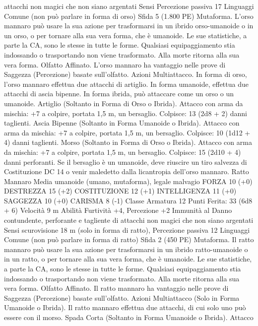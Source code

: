 \begin{multicols}{2}
attacchi non magici che non siano argentati
Sensi Percezione passiva 17
Linguaggi Comune (non può parlare in forma di orso)
Sfida 5 (1.800 PE)
Mutaforma. L’orso mannaro può usare la sua azione per
trasformarsi in un ibrido orso-umanoide o in un orso, o per
tornare alla sua vera forma, che è umanoide. Le sue statistiche, a
parte la CA, sono le stesse in tutte le forme. Qualsiasi
equipaggiamento stia indossando o trasportando non viene
trasformato. Alla morte ritorna alla sua vera forma.
Olfatto Affinato. L’orso mannaro ha vantaggio nelle prove di
Saggezza (Percezione) basate sull’olfatto.
Azioni
Multiattacco. In forma di orso, l’orso mannaro effettua due
attacchi di artiglio. In forma umanoide, effettua due attacchi di
ascia bipenne. In forma ibrida, può attaccare come un orso o un
umanoide.
Artiglio (Soltanto in Forma di Orso o Ibrida). Attacco con arma
da mischia: +7 a colpire, portata 1,5 m, un bersaglio.
Colpisce: 13 (2d8 + 2) danni taglienti.
Ascia Bipenne (Soltanto in Forma Umanoide o Ibrida). Attacco
con arma da mischia: +7 a colpire, portata 1,5 m, un bersaglio.
Colpisce: 10 (1d12 + 4) danni taglienti.
Morso (Soltanto in Forma di Orso o Ibrida). Attacco con arma
da mischia: +7 a colpire, portata 1,5 m, un bersaglio.
Colpisce: 15 (2d10 + 4) danni perforanti. Se il bersaglio è un
umanoide, deve riuscire un tiro salvezza di Costituzione DC 14 o
venir maledetto dalla licantropia dell’orso mannaro.
Ratto Mannaro
Media umanoide (umano, mutaforma), legale malvagio
FORZA 10 (+0)
DESTREZZA 15 (+2)
COSTITUZIONE 12 (+1)
INTELLIGENZA 11 (+0)
SAGGEZZA 10 (+0)
CARISMA 8 (-1)
Classe Armatura 12
\hspace*{0pt}\hfill{Punti Ferita}: 33 (6d8 + 6)
Velocità 9 m
Abilità Furtività +4, Percezione +2
Immunità al Danno contundente, perforante e tagliente di
attacchi non magici che non siano argentati
Sensi scurovisione 18 m (solo in forma di ratto), Percezione
passiva 12
Linguaggi Comune (non può parlare in forma di ratto)
Sfida 2 (450 PE)
Mutaforma. Il ratto mannaro può usare la sua azione per
trasformarsi in un ibrido ratto-umanoide o in un ratto, o per
tornare alla sua vera forma, che è umanoide. Le sue statistiche, a
parte la CA, sono le stesse in tutte le forme. Qualsiasi
equipaggiamento stia indossando o trasportando non viene
trasformato. Alla morte ritorna alla sua vera forma.
Olfatto Affinato. Il ratto mannaro ha vantaggio nelle prove di
Saggezza (Percezione) basate sull’olfatto.
Azioni
Multiattacco (Solo in Forma Umanoide o Ibrida). Il ratto
mannaro effettua due attacchi, di cui solo uno può essere con il
morso.
Spada Corta (Soltanto in Forma Umanoide o Ibrida). Attacco

\end{multicols}

